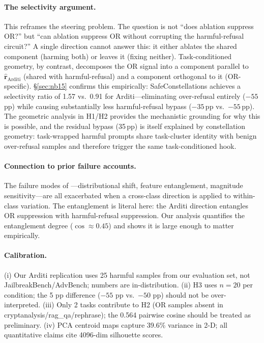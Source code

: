 \documentclass[11pt]{article}
\begin{document}
\paragraph{The selectivity argument.}
This reframes the steering problem. The question is not ``does ablation suppress OR?''
but ``can ablation suppress OR without corrupting the harmful-refusal circuit?'' A
single direction cannot answer this: it either ablates the shared component (harming
both) or leaves it (fixing neither). Task-conditioned geometry, by contrast,
decomposes the OR signal into a component parallel to $\hat{\mathbf{r}}_{\text{Arditi}}$
(shared with harmful-refusal) and a component orthogonal to it (OR-specific).
\S\ref{sec:nb15} confirms this empirically: SafeConstellations achieves a selectivity
ratio of 1.57 vs.\ 0.91 for Arditi---eliminating over-refusal entirely ($-55$\,pp)
while causing substantially less harmful-refusal bypass ($-35$\,pp vs.\ $-55$\,pp).
The geometric analysis in H1/H2 provides the mechanistic grounding for why this is
possible, and the residual bypass (35\,pp) is itself explained by constellation
geometry: task-wrapped harmful prompts share task-cluster identity with benign
over-refusal samples and therefore trigger the same task-conditioned hook.

\paragraph{Connection to prior failure accounts.}
The failure modes of \citet{braun2025unreliability}---distributional shift, feature
entanglement, magnitude sensitivity---are all exacerbated when a cross-class direction
is applied to within-class variation. The entanglement is literal here: the Arditi
direction entangles OR suppression with harmful-refusal suppression. Our analysis
quantifies the entanglement degree ($\cos \approx 0.45$) and shows it is large enough
to matter empirically.

\paragraph{Calibration.}
(i) Our Arditi replication uses 25 harmful samples from our evaluation set, not
JailbreakBench/AdvBench; numbers are in-distribution.
(ii) H3 uses $n=20$ per condition; the 5 pp difference ($-55$ pp vs.\ $-50$ pp) should
not be over-interpreted.
(iii) Only 2 tasks contribute to H2 (OR samples absent in cryptanalysis/rag\_qa/rephrase);
the 0.564 pairwise cosine should be treated as preliminary.
(iv) PCA centroid maps capture 39.6\% variance in 2-D; all quantitative claims cite
4096-dim silhouette scores.
\end{document}
